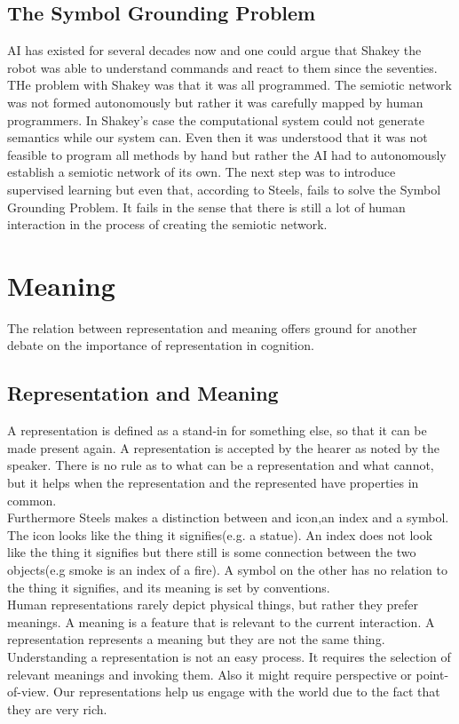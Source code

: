 \documentclass{article}
\begin{document}
	\subsection{The Symbol Grounding Problem}
	AI has existed for several decades now and one could argue that Shakey the robot was able to understand commands and react to them since the seventies. THe problem with Shakey was that it was all programmed. The semiotic network was not formed autonomously but rather it was carefully mapped by human programmers. In Shakey's case the computational system could not generate semantics while our system can. Even then it was understood that it was not feasible to program all methods by hand but rather the AI had to autonomously establish a semiotic network of its own. The next step was to introduce supervised learning but even that, according to Steels, fails to solve the Symbol Grounding Problem. It fails in the sense that there is still a lot of human interaction in the process of creating the semiotic network.
	\section{Meaning}
	The relation between representation and meaning offers ground for another debate on the importance of representation in cognition.
	\subsection{Representation and Meaning}
	A representation is defined as a stand-in for something else, so that it can be made present again. A representation is accepted by the hearer as noted by the speaker. There is no rule as to what can be a representation and what cannot, but it helps when the representation and the represented have properties in common.\\
	Furthermore Steels makes a distinction between and icon,an index and a symbol. The icon looks like the thing it signifies(e.g. a statue). An index does not look like the thing it signifies but there still is some connection between the two objects(e.g smoke is an index of a fire). A symbol on the other has no relation to the thing it signifies, and its meaning is set by conventions. \\
	Human representations rarely depict physical things, but rather they prefer meanings. A meaning is a feature that is relevant to the current interaction.
	A representation represents a meaning but they are not the same thing. \\
	Understanding a representation is not an easy process. It requires the selection of relevant meanings and invoking them. Also it might require perspective or point-of-view. Our representations help us engage with the world due to the fact that they are very rich.
\end{document}
